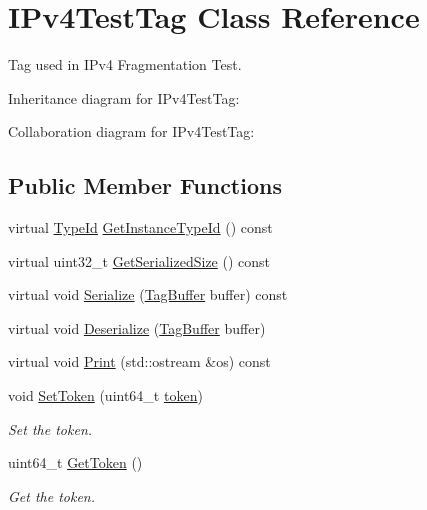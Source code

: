 \hypertarget{classIPv4TestTag}{}\section{I\+Pv4\+Test\+Tag Class Reference}
\label{classIPv4TestTag}


Tag used in I\+Pv4 Fragmentation Test.  




Inheritance diagram for I\+Pv4\+Test\+Tag\+:


Collaboration diagram for I\+Pv4\+Test\+Tag\+:
\subsection*{Public Member Functions}
\begin{DoxyCompactItemize}
\item 
virtual \hyperlink{classns3_1_1TypeId}{Type\+Id} \hyperlink{classIPv4TestTag_a141450142a89f5bb09226d536de785a2}{Get\+Instance\+Type\+Id} () const 
\item 
virtual uint32\+\_\+t \hyperlink{classIPv4TestTag_a0fa1f18e1b4b2130d0548e927b11b02f}{Get\+Serialized\+Size} () const 
\item 
virtual void \hyperlink{classIPv4TestTag_a0d8b2205a87ab58da0a1ee4d4cb03089}{Serialize} (\hyperlink{classns3_1_1TagBuffer}{Tag\+Buffer} buffer) const 
\item 
virtual void \hyperlink{classIPv4TestTag_ad92f20b05b7267ff72199c0efdfa19ad}{Deserialize} (\hyperlink{classns3_1_1TagBuffer}{Tag\+Buffer} buffer)
\item 
virtual void \hyperlink{classIPv4TestTag_af6060759443f694fda9bc0a5e89628dd}{Print} (std\+::ostream \&os) const 
\item 
void \hyperlink{classIPv4TestTag_a4af8d82a226b8d0871f37086354c1406}{Set\+Token} (uint64\+\_\+t \hyperlink{classIPv4TestTag_a66456461ce06d3a9d58472e224bd68f6}{token})
\begin{DoxyCompactList}\small\item\em Set the token. \end{DoxyCompactList}\item 
uint64\+\_\+t \hyperlink{classIPv4TestTag_a08214d998ffb2812da56dd9d5dca7da7}{Get\+Token} ()
\begin{DoxyCompactList}\small\item\em Get the token. \end{DoxyCompactList}\end{DoxyCompactItemize}
